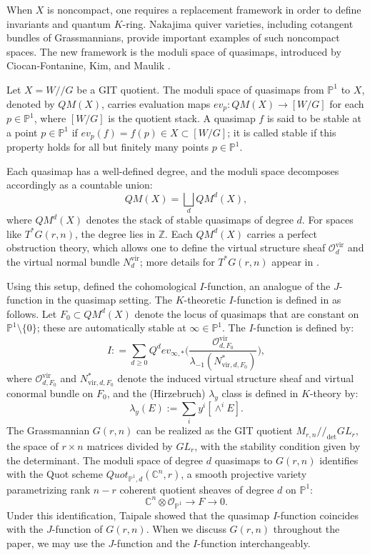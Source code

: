 \documentclass{amsart}
\begin{document}
When $X$ is noncompact, one requires a replacement framework in order to define invariants and quantum $K$-ring. Nakajima quiver varieties, including cotangent bundles of Grassmannians, provide important examples of such noncompact spaces. The new framework is the moduli space of quasimaps, introduced by Ciocan-Fontanine, Kim, and Maulik \cite{CKM}.

 Let $X = W//G$ be a GIT quotient. The moduli space of quasimaps from $\mathbb{P}^1$ to $X$, denoted by $QM(X)$, carries evaluation maps $ev_p: QM(X) \to [W/G]$ for each $p \in \mathbb{P}^1$, where $[W/G]$ is the quotient stack. A quasimap $f$ is said to be stable at a point $p \in \mathbb{P}^1$ if $ev_p(f) = f(p)\in X \subset [W/G]$; it is called stable if this property holds for all but finitely many points $p \in \mathbb{P}^1$. 

Each quasimap has a well-defined degree, and the moduli space decomposes accordingly as a countable union:
\[
QM(X)= \bigsqcup_d QM^d(X),
\]
 where $QM^d(X)$ denotes the stack of stable quasimaps of degree $d$. For spaces like $T^*G(r,n)$, the degree lies in $\mathbb{Z}$. Each $QM^d(X)$ carries a perfect obstruction theory, which allows one to define the virtual structure sheaf $\mathcal{O}_{d}^\mathrm{vir}$ and the virtual normal bundle $N_{d}^{\mathrm{vir}}$; more details for $T^*G(r,n)$ appear in .

Using this setup, \cite{CKM} defined the cohomological $I$-function, an analogue of the $J$-function in the quasimap setting. The $K$-theoretic $I$-function is defined in \cite{wen2019ktheoreticifunctionvthetamathbfg} as follows. Let $F_0 \subset QM^d(X)$ denote the locus of quasimaps that are constant on $\mathbb{P}^1 \setminus \{0\}$; these are automatically stable at $\infty \in \mathbb{P}^1$. The $I$-function is defined by:
\begin{equation} \label{def_I}
I: = \sum_{d \geq 0} Q^{d} ev_{{\infty},*}\Big(\frac{\mathcal{O}_{d,F_0}^{\mathrm{vir}}}{\lambda_{-1}(N_{\mathrm{vir},d,F_0}^{*})}\Big),
\end{equation}
where $\mathcal{O}_{d,F_0}^{\mathrm{vir}}$ and $N_{\mathrm{vir},d,F_0}^{*}$ denote the induced virtual structure sheaf and virtual conormal bundle on $F_0$, and the (Hirzebruch) $\lambda_{y}$ class is defined in $K$-theory by: 
\[ \lambda_{y}(E) := \sum_{i} y^i[\wedge^i E]. \]
The Grassmannian $G(r,n)$ can be realized as the GIT quotient $M_{r,n}//_{\det} GL_r$, the space of $ r \times n$ matrices divided by $GL_r$, with the stability condition given by the determinant.
The moduli space of degree $d$ quasimaps to $G(r,n)$ identifies with the Quot scheme $Quot_{\mathbb{P}^1,d}(\mathbb{C}^n,r)$, a smooth projective variety parametrizing rank $n-r$ coherent quotient sheaves of degree $d$ on $\mathbb{P}^1$:
\[
\mathbb{C}^n \otimes \mathcal{O}_{\mathbb{P}^1} \to F \to 0.
\]
Under this identification, Taipale \cite{Taipale} showed that the quasimap $I$-function coincides with the $J$-function of $G(r,n)$. When we discuss $G(r,n)$ throughout the paper, we may use the $J$-function and the $I$-function interchangeably.
\end{document}
